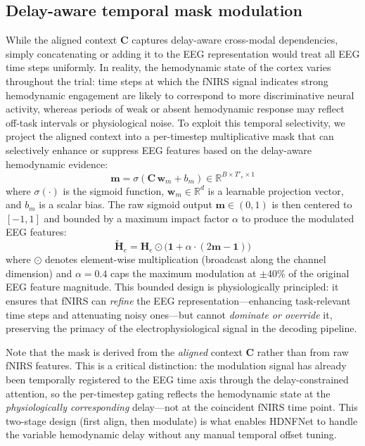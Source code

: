 \documentclass[preprint,12pt,authoryear]{elsarticle}
\begin{document}
\subsection{Delay-aware temporal mask modulation}
\label{sec:mask_modulation}

While the aligned context $\mathbf{C}$ captures delay-aware cross-modal dependencies, simply concatenating or adding it to the EEG representation would treat all EEG time steps uniformly. In reality, the hemodynamic state of the cortex varies throughout the trial: time steps at which the fNIRS signal indicates strong hemodynamic engagement are likely to correspond to more discriminative neural activity, whereas periods of weak or absent hemodynamic response may reflect off-task intervals or physiological noise. To exploit this temporal selectivity, we project the aligned context into a per-timestep multiplicative mask that can selectively enhance or suppress EEG features based on the delay-aware hemodynamic evidence:
\begin{equation}
\label{eq:mask_sigmoid}
\mathbf{m} = \sigma\!\left(\mathbf{C}\,\mathbf{w}_m + b_m\right) \in \mathbb{R}^{B \times T'_e \times 1}
\end{equation}
where $\sigma(\cdot)$ is the sigmoid function, $\mathbf{w}_m \in \mathbb{R}^{d}$ is a learnable projection vector, and $b_m$ is a scalar bias. The raw sigmoid output $\mathbf{m} \in (0, 1)$ is then centered to $[-1, 1]$ and bounded by a maximum impact factor $\alpha$ to produce the modulated EEG features:
\begin{equation}
\label{eq:mask_modulation}
\tilde{\mathbf{H}}_e = \mathbf{H}_e \odot \bigl(\mathbf{1} + \alpha \cdot (2\mathbf{m} - \mathbf{1})\bigr)
\end{equation}
where $\odot$ denotes element-wise multiplication (broadcast along the channel dimension) and $\alpha = 0.4$ caps the maximum modulation at $\pm$40\% of the original EEG feature magnitude. This bounded design is physiologically principled: it ensures that fNIRS can \textit{refine} the EEG representation---enhancing task-relevant time steps and attenuating noisy ones---but cannot \textit{dominate or override} it, preserving the primacy of the electrophysiological signal in the decoding pipeline.

Note that the mask is derived from the \textit{aligned} context $\mathbf{C}$ rather than from raw fNIRS features. This is a critical distinction: the modulation signal has already been temporally registered to the EEG time axis through the delay-constrained attention, so the per-timestep gating reflects the hemodynamic state at the \textit{physiologically corresponding} delay---not at the coincident fNIRS time point. This two-stage design (first align, then modulate) is what enables HDNFNet to handle the variable hemodynamic delay without any manual temporal offset tuning.
\end{document}
